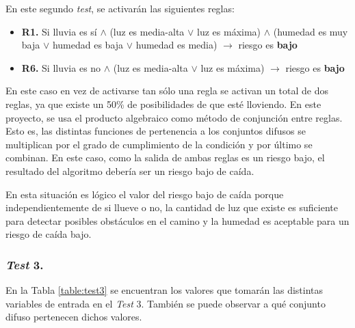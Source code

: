 En este segundo \textit{test}, se activarán las siguientes reglas:

\begin{itemize}
\item \textbf{R1.} Si lluvia es sí $\wedge$ (luz es media-alta $\vee$ luz es máxima) $\wedge$ (humedad es muy baja $\vee$ humedad es baja $\vee$ humedad es media) $\rightarrow$ riesgo es \textbf{bajo} 

\item \textbf{R6.} Si lluvia es no $\wedge$ (luz es media-alta $\vee$ luz es máxima) $\rightarrow$ riesgo es \textbf{bajo}
\end{itemize}

En este caso en vez de activarse tan sólo una regla se activan un total de dos reglas, ya que existe un 50\% de posibilidades de que esté lloviendo. En este proyecto, se usa el producto algebraico como método de conjunción entre reglas. Esto es, las distintas funciones de pertenencia a los conjuntos difusos se multiplican por el grado de cumplimiento de la condición y por último se combinan. En este caso, como la salida de ambas reglas es un riesgo bajo, el resultado del algoritmo debería ser un riesgo bajo de caída.

En esta situación es lógico el valor del riesgo bajo de caída porque independientemente de si llueve o no, la cantidad de luz que existe es suficiente para detectar posibles obstáculos en el camino y la humedad es aceptable para un riesgo de caída bajo.

\subsubsection{\textit{Test} 3.}

En la Tabla \ref{table:test3} se encuentran los valores que tomarán las distintas variables de entrada en el \textit{Test} 3. También se puede observar a qué conjunto difuso pertenecen dichos valores.

